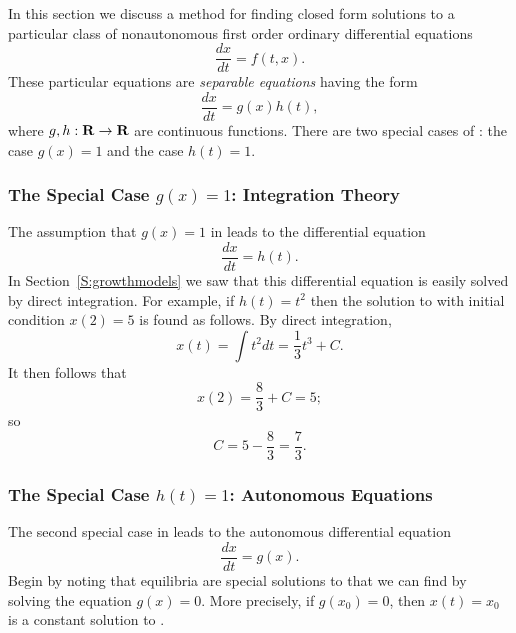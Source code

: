 \documentclass{ximera}
\begin{document}
\label{sec:sov} 

In this section we discuss a method for finding closed form solutions to
a particular class of nonautonomous first order ordinary differential 
equations 
\begin{equation}  \label{e:nonauto}
\frac{dx}{dt} = f(t,x).
\end{equation}
These particular equations are {\em separable equations\/} having the form 
\begin{equation}  \label{eq:gh}
\frac{dx}{dt} = g(x) h(t),
\end{equation}
where $g,h:\mbox{$\bf{R}$}\to\mbox{$\bf{R}$}$ are continuous functions.   There are two special cases 
of : the case $g(x)=1$ and the case $h(t)=1$.  

\subsubsection*{The Special Case $g(x)=1$: Integration Theory}

The assumption that $g(x)=1$ in  leads to the differential 
equation 
\begin{equation}  \label{e:g=1}
\frac{dx}{dt} = h(t).
\end{equation}
In Section~\ref{S:growthmodels} we saw that this differential equation  
is easily solved by direct integration.  For example, if $h(t)=t^2$ then 
the solution to  with initial condition $x(2)=5$ is found as
follows.  By direct integration,
\[
x(t) = \int t^2 dt = \frac{1}{3}t^3 + C.
\]
It then follows that
\[
x(2) = \frac{8}{3} + C = 5;
\]
so 
\[
C = 5 - \frac{8}{3} = \frac{7}{3}.
\]


\subsubsection*{The Special Case $h(t)=1$: Autonomous Equations}

The second special case in  leads to the autonomous 
differential equation
\begin{equation}  \label{e:h=1}
\frac{dx}{dt} = g(x).
\end{equation}
Begin by noting that equilibria are special solutions to  that we 
can find by solving the equation $g(x)=0$.  More precisely, if $g(x_0)=0$, 
then $x(t)=x_0$ is a constant solution to .  
\end{document}
